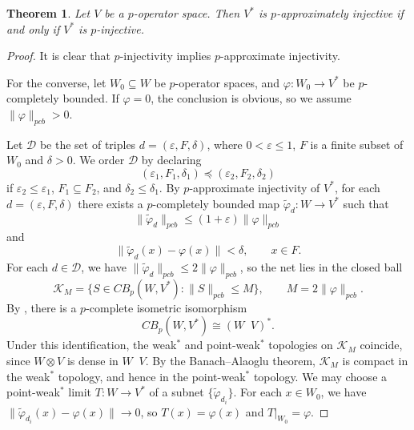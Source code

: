 \documentclass[12pt]{article}
\newtheorem{theorem}{Theorem}[section]
\newcommand{\pcb}{pcb}
\newcommand{\CBp}{CB_p}
\newcommand{\otimesp}{\mathop{\overset{\wedge p}{\otimes}}}
\begin{document}
\begin{theorem}\label{thm:dual-exact-approx}
Let $V$ be a $p$-operator space.  Then $V^*$ is
$p$-approximately injective if and only if $V^*$ is
$p$-injective.
\end{theorem}

\begin{proof}
It is clear that $p$-injectivity implies $p$-approximate injectivity.

For the converse, let $W_0\subseteq W$ be $p$-operator spaces, and $\varphi:W_0\to V^*$ be $p$-completely bounded.
If $\varphi=0$, the conclusion is obvious, so we assume $\|\varphi\|_{\pcb}>0$.

Let $\mathcal{D}$ be the set of triples $d=(\varepsilon,F,\delta)$, where
$0<\varepsilon\leq 1$, $F$ is a finite subset of $W_0$ and $\delta>0$.
We order $\mathcal{D}$ by declaring
\[
        (\varepsilon_1,F_1,\delta_1)\preceq(\varepsilon_2,F_2,\delta_2)
\]
if $\varepsilon_2\leq\varepsilon_1$, $F_1\subseteq F_2$, and
$\delta_2\leq\delta_1$.  By $p$-approximate injectivity of $V^*$,
for each $d=(\varepsilon,F,\delta)$ there exists a $p$-completely bounded map
$\widetilde{\varphi}_d:W\to V^*$ such that
\[
        \|\widetilde{\varphi}_d\|_{\pcb}
        \leq(1+\varepsilon)\|\varphi\|_{\pcb}
\]
and
\[
        \|\widetilde{\varphi}_d(x)-\varphi(x)\|<\delta,\qquad x\in F.
\]
For each $d\in\mathcal{D}$, we have
$\|\widetilde{\varphi}_d\|_{\pcb}\leq 2\|\varphi\|_{\pcb}$, so the net
lies in the closed ball
\[
        \mathcal{K}_M=\{S\in \CBp(W,V^*):\|S\|_{\pcb}\leq M\},
        \qquad M=2\|\varphi\|_{\pcb}.
\]
By \cite[Proposition~4.9]{Daws2007}, there is a $p$-complete isometric isomorphism
\[
        \CBp(W,V^*) \cong (W \otimesp V)^*.
\]
Under this identification, the weak$^*$ and point-weak$^*$ topologies on
$\mathcal{K}_M$ coincide, since $W\otimes V$ is dense in $W\otimesp V$.
By the Banach--Alaoglu theorem, $\mathcal{K}_M$ is compact in the weak$^*$ topology,
and hence in the point-weak$^*$ topology.
We may choose a point-weak$^*$ limit $T:W\to V^*$ of a subnet
$\{\widetilde{\varphi}_{d_i}\}$.
For each $x\in W_0$, we have $\|\widetilde{\varphi}_{d_i}(x)-\varphi(x)\|\to 0$, so
$T(x)=\varphi(x)$ and $T|_{W_0}=\varphi$.


\end{proof}
\end{document}
